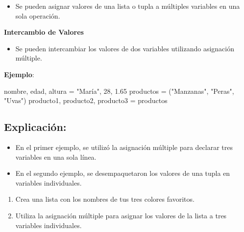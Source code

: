 \documentclass[
  a4paper,
  DIV=11,
  numbers=noendperiod,
  onepage,
  openany]{scrreprt}
\newenvironment{Shaded}{\begin{snugshade}}{\end{snugshade}}
\newcommand{\DecValTok}[1]{\textcolor[rgb]{0.68,0.00,0.00}{#1}}
\newcommand{\FloatTok}[1]{\textcolor[rgb]{0.68,0.00,0.00}{#1}}
\newcommand{\NormalTok}[1]{\textcolor[rgb]{0.00,0.23,0.31}{#1}}
\newcommand{\OperatorTok}[1]{\textcolor[rgb]{0.37,0.37,0.37}{#1}}
\newcommand{\StringTok}[1]{\textcolor[rgb]{0.13,0.47,0.30}{#1}}
\providecommand{\tightlist}{%
  \setlength{\itemsep}{0pt}\setlength{\parskip}{0pt}}\usepackage{longtable,booktabs,array}
\begin{document}
\begin{itemize}
\tightlist
\item
  Se pueden asignar valores de una lista o tupla a múltiples variables
  en una sola operación.
\end{itemize}

\textbf{Intercambio de Valores}

\begin{itemize}
\tightlist
\item
  Se pueden intercambiar los valores de dos variables utilizando
  asignación múltiple.
\end{itemize}

\textbf{Ejemplo}:

\begin{Shaded}
\begin{Highlighting}[]
\NormalTok{nombre, edad, altura }\OperatorTok{=} \StringTok{"María"}\NormalTok{, }\DecValTok{28}\NormalTok{, }\FloatTok{1.65}
\NormalTok{productos }\OperatorTok{=}\NormalTok{ (}\StringTok{"Manzanas"}\NormalTok{, }\StringTok{"Peras"}\NormalTok{, }\StringTok{"Uvas"}\NormalTok{)}
\NormalTok{producto1, producto2, producto3 }\OperatorTok{=}\NormalTok{ productos}
\end{Highlighting}
\end{Shaded}

\subsection{Explicación:}\label{explicaciuxf3n-3}

\begin{itemize}
\item
  En el primer ejemplo, se utilizó la asignación múltiple para declarar
  tres variables en una sola línea.
\item
  En el segundo ejemplo, se desempaquetaron los valores de una tupla en
  variables individuales.
\end{itemize}

\begin{tcolorbox}[enhanced jigsaw, leftrule=.75mm, bottomtitle=1mm, title=\textcolor{quarto-callout-tip-color}{\faLightbulb}\hspace{0.5em}{Actividad Práctica}, colbacktitle=quarto-callout-tip-color!10!white, coltitle=black, bottomrule=.15mm, colframe=quarto-callout-tip-color-frame, titlerule=0mm, opacityback=0, rightrule=.15mm, toptitle=1mm, opacitybacktitle=0.6, arc=.35mm, breakable, colback=white, toprule=.15mm, left=2mm]

\begin{enumerate}
\def\labelenumi{\arabic{enumi}.}
\item
  Crea una lista con los nombres de tus tres colores favoritos.
\item
  Utiliza la asignación múltiple para asignar los valores de la lista a
  tres variables individuales.
\end{enumerate}

\end{tcolorbox}
\end{document}
